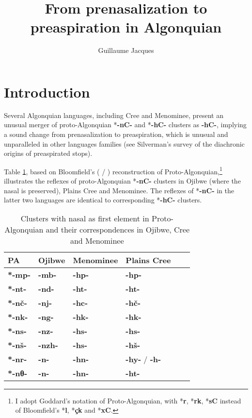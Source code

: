 \documentclass[oneside,a4paper,11pt]{article}
\newcommand{\ipa}[1]{{\phon\mbox{\textbf{#1}}}}
\begin{document}
 
\title{From prenasalization to preaspiration in Algonquian}
\author{Guillaume Jacques}
\maketitle
 
 \section{Introduction}
Several Algonquian languages, including Cree and Menominee, present an unusual merger of proto-Algonquian *\ipa{-nC-} and *\ipa{-hC-} clusters as \ipa{-hC-}, implying a sound change from prenasalization to preaspiration, which is unusual and unparalleled in other languages families (see Silverman's \citeyear{silverman03preaspirated} survey of the diachronic origins of preaspirated stops).


Table \ref{tab:nC.PA}, based on Bloomfield's (\citeyear[154-5]{bloomfield25central} / \citeyear{bloomfield46proto}) reconstruction of Proto-Algonquian,\footnote{I adopt Goddard's \citealt{goddard98arapaho} notation of Proto-Algonquian, with *\ipa{r}, *\ipa{rk}, *\ipa{sC} instead of Bloomfield's *\ipa{l}, *\ipa{çk} and *\ipa{xC}. } illustrates the reflexes of proto-Algonquian *\ipa{-nC-} clusters in Ojibwe (where the nasal is preserved), Plains Cree and Menominee. The reflexes of *\ipa{-nC-} in the latter two languages are identical to corresponding *\ipa{-hC-} clusters. 
 
 \begin{table}
\caption{Clusters with nasal as first element in Proto-Algonquian and their correspondences in Ojibwe, Cree and Menominee} \label{tab:nC.PA} \centering
\begin{tabular}{llllll}
\toprule
PA & Ojibwe & Menominee & Plains Cree \\
\midrule
\ipa{*-mp-} & \ipa{-mb-} & \ipa{-hp-} & \ipa{-hp-} \\
\ipa{*-nt-} & \ipa{-nd-} & \ipa{-ht-} & \ipa{-ht-} \\
\ipa{*-nč-} & \ipa{-nj-} & \ipa{-hc-} & \ipa{-hč-} \\
\ipa{*-nk-} & \ipa{-ng-} & \ipa{-hk-} & \ipa{-hk-} \\
\ipa{*-ns-} & \ipa{-nz-} & \ipa{-hs-} & \ipa{-hs-} \\
\ipa{*-nš-} & \ipa{-nzh-} & \ipa{-hs-} & \ipa{-hš-} \\
\ipa{*-nr-} & \ipa{-n-} & \ipa{-hn-} & \ipa{-hy-} / \ipa{-h-} \\
\ipa{*-nθ-} & \ipa{-n-} & \ipa{-hn-} & \ipa{-ht-} \\
\bottomrule
\end{tabular}
\end{table}
\end{document}
